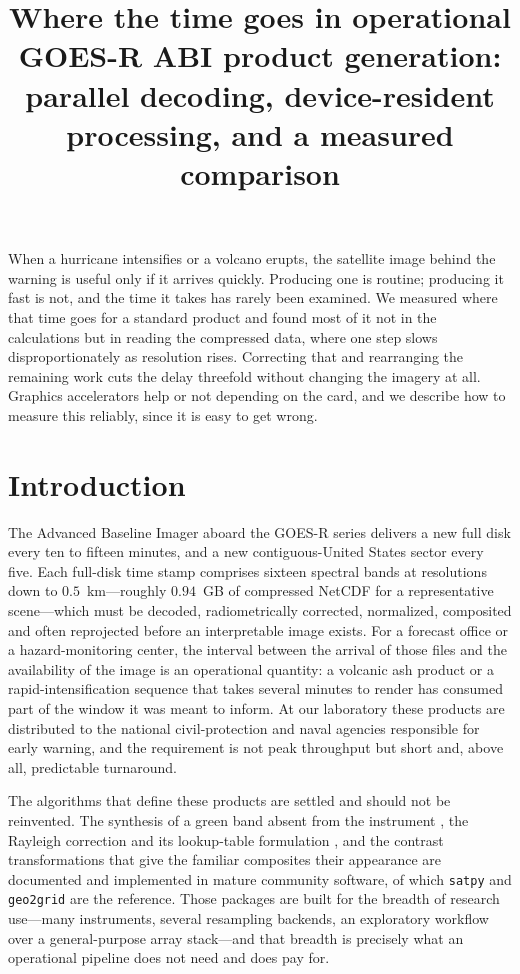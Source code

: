 \documentclass{ametsocV6.1}
\title{Where the time goes in operational GOES-R ABI product generation:
parallel decoding, device-resident processing, and a measured comparison}
\affiliation{\aff{a}{Laboratorio Nacional de Observaci\'on de la Tierra (LANOT),
Universidad Nacional Aut\'onoma de M\'exico, Mexico City, Mexico}}
\begin{document}
\maketitle

\statement
When a hurricane intensifies or a volcano erupts, the satellite image behind
the warning is useful only if it arrives quickly. Producing one is routine;
producing it fast is not, and the time it takes has rarely been examined. We
measured where that time goes for a standard product and found most of it not
in the calculations but in reading the compressed data, where one step slows
disproportionately as resolution rises. Correcting that and rearranging the
remaining work cuts the delay threefold without changing the imagery at all.
Graphics accelerators help or not depending on the card, and we describe how to
measure this reliably, since it is easy to get wrong.

\section{Introduction}
\label{sec:intro}

The Advanced Baseline Imager aboard the GOES-R series delivers a new full disk
every ten to fifteen minutes, and a new contiguous-United States sector every
five. Each full-disk time stamp comprises sixteen spectral bands at resolutions
down to $0.5$~km---roughly $0.94$~GB of compressed NetCDF for a representative
scene---which must be decoded, radiometrically corrected, normalized, composited
and often reprojected before an interpretable image exists. For a forecast
office or a hazard-monitoring center, the interval between the arrival of those
files and the availability of the image is an operational quantity: a volcanic
ash product or a rapid-intensification sequence that takes several minutes to
render has consumed part of the window it was meant to inform. At our
laboratory these products are distributed to the national civil-protection and
naval agencies responsible for early warning, and the requirement is not peak
throughput but short and, above all, predictable turnaround.

The algorithms that define these products are settled and should not be
reinvented. The synthesis of a green band absent from the instrument
\citep{Bah2018,Miller2016}, the Rayleigh correction and its lookup-table
formulation \citep{Bucholtz1995,Bodhaine1999,Scheirer2018,PySpectralLUT2018},
and the contrast transformations that give the familiar composites their
appearance are documented and implemented in mature community software, of
which \texttt{satpy} and \texttt{geo2grid} \citep{Geo2Grid2026} are the
reference. Those packages are built for the breadth of research use---many
instruments, several resampling backends, an exploratory workflow over a
general-purpose array stack---and that breadth is precisely what an operational
pipeline does not need and does pay for.
\end{document}
